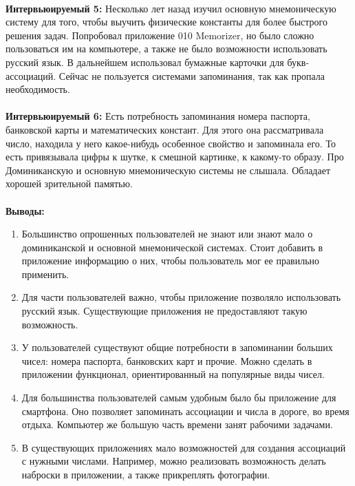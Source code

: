 \documentclass[draft]{article}
\begin{document}
~\\
\textbf{Интервьюируемый 5:} Несколько лет назад изучил основную мнемоническую систему для того, чтобы выучить физические константы для более быстрого решения задач. Попробовал приложение 010 Memorizer, но было сложно пользоваться им на компьютере, а также не было возможности использовать русский язык. В дальнейшем использовал бумажные карточки для букв-ассоциаций. Сейчас не пользуется системами запоминания, так как пропала необходимость.\\
~\\
\textbf{Интервьюируемый 6:} Есть потребность запоминания номера паспорта, банковской карты и математических констант. Для этого она рассматривала число, находила у него какое-нибудь особенное свойство и запоминала его. То есть привязывала цифры к шутке, к смешной картинке, к какому-то образу. Про Доминиканскую и основную мнемоническую системы не слышала. Обладает хорошей зрительной памятью.\\
~\\
\textbf{Выводы:}
\begin{enumerate}
\item Большинство опрошенных пользователей не знают или знают мало о доминиканской и основной мнемонической системах. Стоит добавить в приложение информацию о них, чтобы пользователь мог ее правильно применить.
\item Для части пользователей важно, чтобы приложение позволяло использовать русский язык. Существующие приложения не предоставляют такую возможность.
\item У пользователей существуют общие потребности в запоминании больших чисел: номера паспорта, банковских карт и прочие. Можно сделать в приложении функционал, ориентированный на популярные виды чисел.
\item Для большинства пользователей самым удобным было бы приложение для смартфона. Оно позволяет запоминать ассоциации и числа в дороге, во время отдыха. Компьютер же большую часть времени занят рабочими задачами.
\item В существующих приложениях мало возможностей для создания ассоциаций с нужными числами. Например, можно реализовать возможность делать наброски в приложении, а также прикреплять фотографии.
\end{enumerate}
\end{document}
